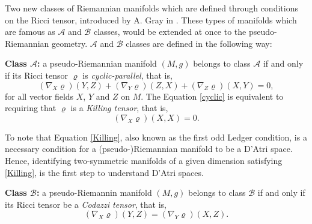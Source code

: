 \documentclass[11pt,oneside,leqno]{amsart}
\theoremstyle{plain}
\begin{document}
Two new classes of Riemannian manifolds which are defined through conditions on the Ricci tensor, introduced by A. Gray in \cite{Gr}. These types of manifolds which are famous as ${\mathcal A}$ and ${\mathcal B}$ classes, would be extended at once to the pseudo-Riemannian geometry. ${\mathcal A}$ and ${\mathcal B}$ classes are defined in the following way:

{\bf Class ${\mathcal A}$:} a pseudo-Riemannian manifold $(M, g)$ belongs to class ${\mathcal A}$ if and only if its Ricci tensor $\varrho$ is {\em cyclic-parallel}, that is,
\begin{equation}\label{cyclic}
(\nabla_X \varrho)(Y,Z)+(\nabla_Y\varrho)(Z,X)+(\nabla_Z\varrho)(X,Y)=0,
\end{equation}
for all vector fields $X$, $Y$ and $Z$  on $M$. The Equation \eqref{cyclic} is equivalent to requiring that $\varrho$ is a {\em Killing tensor}, that is,
\begin{equation}\label{Killing}
(\nabla_X\varrho)(X,X)=0.
\end{equation}

To note that Equation \eqref{Killing}, also known as the first odd Ledger condition, is a necessary condition for a (pseudo-)Riemannian manifold to be a D'Atri space. Hence, identifying two-symmetric manifolds of a given dimension satisfying \eqref{Killing}, is the first step to understand D'Atri spaces.

{\bf Class ${\mathcal B}$:} a pseudo-Riemannin manifold $(M,g)$ belongs to class ${\mathcal B}$ if and only if its Ricci tensor be a {\em Codazzi tensor}, that is,
\begin{equation}\label{Codazzi}
(\nabla_X\varrho)(Y,Z)=(\nabla_Y\varrho)(X,Z).
\end{equation}
\end{document}
